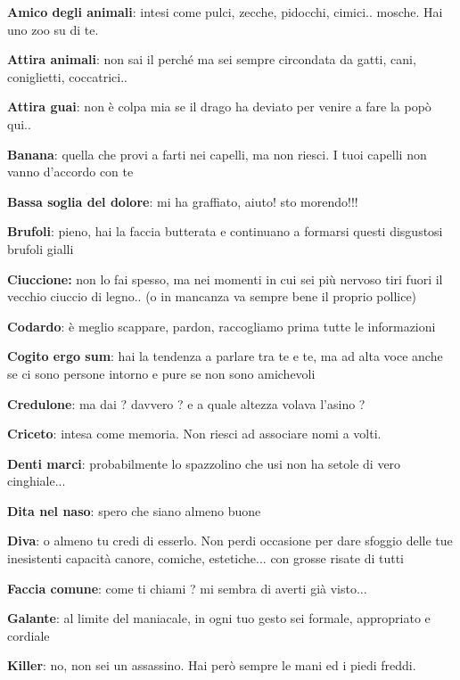 \documentclass[a4paper,11pt,twoside,openany]{book}
\begin{document}
{\textbf{Amico degli animali}: intesi come pulci, zecche, pidocchi, cimici.. mosche. Hai uno zoo su di te.

\textbf{Attira animali}: non sai il perché ma sei sempre circondata da gatti, cani, coniglietti, coccatrici..

\textbf{Attira guai}: non è colpa mia se il drago ha deviato per venire a fare la popò qui..

\textbf{Banana}: quella che provi a farti nei capelli, ma non riesci. 
I tuoi capelli non vanno d'accordo con te

\textbf{Bassa soglia del dolore}: mi ha graffiato, aiuto! sto morendo!!!

\textbf{Brufoli}: pieno, hai la faccia butterata e continuano a formarsi questi disgustosi brufoli gialli

\textbf{Ciuccione:} non lo fai spesso, ma nei momenti in cui sei più nervoso tiri fuori il vecchio ciuccio di legno.. (o in mancanza va sempre bene il proprio pollice)

\textbf{Codardo}: è meglio scappare, pardon, raccogliamo prima tutte le informazioni

\textbf{Cogito ergo sum}: hai la tendenza a parlare tra te e te, ma ad alta voce anche se ci sono persone intorno e pure se non sono amichevoli

\textbf{Credulone}: ma dai ? davvero ? e a quale altezza volava l'asino ?

\textbf{Criceto}: intesa come memoria. Non riesci ad associare nomi a volti.

\textbf{Denti marci}: probabilmente lo spazzolino che usi non ha setole di vero cinghiale...

\textbf{Dita nel naso}: spero che siano almeno buone

\textbf{Diva}: o almeno tu credi di esserlo. Non perdi occasione per dare sfoggio delle tue inesistenti capacità canore, comiche, estetiche... con grosse risate di tutti

\textbf{Faccia comune}: come ti chiami ? mi sembra di averti già visto...

\textbf{Galante}: al limite del maniacale, in ogni tuo gesto sei formale, appropriato e cordiale

\textbf{Killer}: no, non sei un assassino. Hai però sempre le mani ed i piedi freddi.

}
\end{document}
